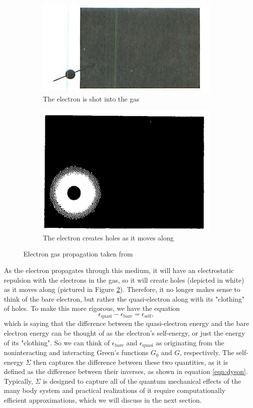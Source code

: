 \documentclass[12pt]{caltech_thesis}
\begin{document}
\begin{figure}
\begin{subfigure}{.5\textwidth}
  \centering
  \includegraphics[width=.8\linewidth]{shot.png}
  \caption{The electron is shot into the gas}
  \label{fig:shot}
\end{subfigure}
\begin{subfigure}{.5\textwidth}
  \centering
  \includegraphics[width=.8\linewidth]{clothing.png}
  \caption{The electron creates holes as it moves along}
  \label{fig:clothing}
\end{subfigure}
\caption{Electron gas propagation taken from \textcite{mattuck_guide_1992}}
\label{fig:propagates}
\end{figure}
As the electron propagates through this medium, it will have an electrostatic repulsion with the electrons in the gas, so it will create holes (depicted in white) as it moves along (pictured in Figure \ref{fig:clothing}). Therefore, it no longer makes sense to think of the bare electron, but rather the quasi-electron along with its "clothing" of holes. To make this more rigorous, we have the equation
\begin{equation}
    \epsilon_{\text{quasi}} - \epsilon_{\text{bare}} = \epsilon_{\text{self}},
\end{equation}
which is saying that the difference between the quasi-electron energy and the bare electron energy can be thought of as the electron's self-energy, or just the energy of its "clothing". So we can think of $\epsilon_{\text{bare}}$ and $\epsilon_{\text{quasi}}$ as originating from the noninteracting and interacting Green's functions $G_0$ and $G$, respectively. The self-energy $\Sigma$ then captures the difference between these two quantities, as it is defined as the difference between their inverses, as shown in equation \ref{eqn:dyson}.
 Typically, $\Sigma $ is designed to capture all of the quantum mechanical effects of the many body system and practical realizations of it require computationally efficient approximations, which we will discuss in the next section.
\end{document}
